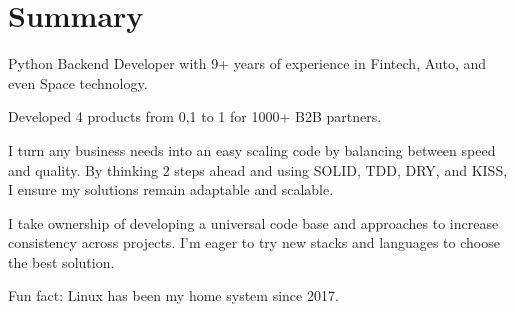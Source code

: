 \section{Summary}
Python Backend Developer with 9+ years of experience in Fintech, Auto, and even Space technology.

\vspace{0.4em}
Developed 4 products from 0,1 to 1 for 1000+ B2B partners.

\vspace{0.4em}
I turn any business needs into an easy scaling code by balancing between speed and quality. By thinking 2 steps ahead and using SOLID, TDD, DRY, and KISS, I ensure my solutions remain adaptable and scalable.

\vspace{0.4em}
I take ownership of developing a universal code base and approaches to increase consistency across projects. I'm eager to try new stacks and languages to choose the best solution.

\vspace{0.4em}
Fun fact: Linux has been my home system since 2017.

